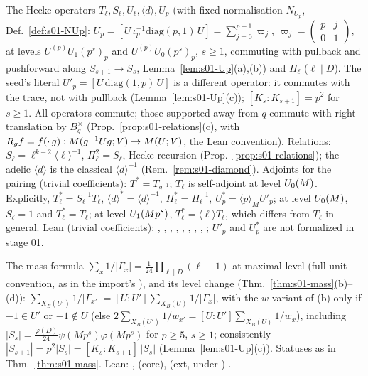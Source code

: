 \begin{interface}\label{if:s01-hecke}
The Hecke operators $T_\ell,S_\ell,U_\ell,\langle d\rangle,U_p$ (with fixed normalisation $N_{U_p}$, Def.~\ref{def:s01-NUp}:
$U_p=[U\,\iota_p^{-1}\mathrm{diag}(p,1)\,U]=\sum_{j=0}^{p-1}\varpi_j$, $\varpi_j=\left(\begin{smallmatrix}p&j\\0&1\end{smallmatrix}\right)$, at levels
$U^{(p)}U_1(p^s)_p$ and $U^{(p)}U_0(p^s)_p$, $s\ge1$, commuting with pullback and pushforward along $S_{s+1}\to S_s$,
Lemma~\ref{lem:s01-Up}(a),(b)) and $\Pi_\ell$ ($\ell\mid D$). The seed's literal $U'_p=[U\,\mathrm{diag}(1,p)\,U]$ is a different operator: it
commutes with the trace, not with pullback (Lemma~\ref{lem:s01-Up}(c)); $[K_s:K_{s+1}]=p^2$ for $s\ge1$. All operators commute; those
supported away from $q$ commute with right translation by $B_q^\times$ (Prop.~\ref{prop:s01-relations}(c), with
$R_gf=f(\cdot\,g):M(g^{-1}Ug;V)\to M(U;V)$, the Lean convention).
Relations: $S_\ell=\ell^{k-2}\langle\ell\rangle^{-1}$, $\Pi_\ell^2=S_\ell$, Hecke recursion (Prop.~\ref{prop:s01-relations}); the adelic
$\langle d\rangle$ is the classical $\langle d\rangle^{-1}$ (Rem.~\ref{rem:s01-diamond}).
Adjoints for the pairing (trivial coefficients): $T^*=T_{g^{-1}}$; $T_\ell$ is self-adjoint at level $U_0(M)$. Explicitly,
$T_\ell^*=S_\ell^{-1}T_\ell$, $\langle d\rangle^*=\langle d\rangle^{-1}$, $\Pi_\ell^*=\Pi_\ell^{-1}$, $U_p^*=\langle p\rangle_MU'_p$; at level $U_0(M)$,
$S_\ell=1$ and $T_\ell^*=T_\ell$; at level $U_1(Mp^s)$, $T_\ell^*=\langle\ell\rangle T_\ell$, which differs from $T_\ell$ in general.
Lean (trivial coefficients): , ,
, ,
, , ,
,  \stformal{}; $U'_p$ and $U_p^*$ are not
formalized in stage 01.
\end{interface}

\begin{interface}\label{if:s01-mass}
The mass formula $\sum_x1/|\Gamma_x|=\frac1{24}\prod_{\ell\mid D}(\ell-1)$ at maximal level (full-unit convention, as in the import's
), and its level change (Thm.~\ref{thm:s01-mass}(b)--(d)): $\sum_{X_B(U')}1/|\Gamma_{x'}|=[U:U']\sum_{X_B(U)}1/|\Gamma_x|$,
with the $w$-variant of (b) only if $-1\in U'$ or $-1\notin U$ (else $2\sum_{X_B(U')}1/w_{x'}=[U:U']\sum_{X_B(U)}1/w_x$), including
$|S_s|=\frac{\varphi(D)}{24}\psi(Mp^s)\varphi(Mp^s)$ for $p\ge5$, $s\ge1$; consistently $|S_{s+1}|=p^2|S_s|=[K_s:K_{s+1}]\,|S_s|$
(Lemma~\ref{lem:s01-Up}(c)). Statuses as in Thm.~\ref{thm:s01-mass}.
Lean: ,  (core), 
(ext, under ) \stformal{}.
\end{interface}
